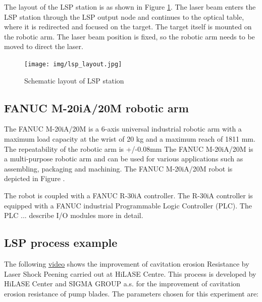 The layout of the LSP station is as shown in Figure \ref{fig:lsplayout}. The laser
beam enters the LSP station through the LSP output node and
continues to the optical table, where it is redirected and
focused on the target. The target itself is mounted on the
robotic arm. The laser beam position is fixed, so the robotic
arm needs to be moved to direct the laser.

\begin{figure}[h]
    \centering
    \texttt{[image: img/lsp\_layout.jpg]}
    \caption{Schematic layout of LSP station}
    \label{fig:lsplayout}
\end{figure}

\subsection{FANUC M-20iA/20M robotic arm}

The FANUC M-20iA/20M is a 6-axis universal industrial robotic arm with a maximum load capacity at the wrist of 20 kg and a maximum reach of 1811 mm. The repeatability of the robotic arm is +/-0.08mm The FANUC M-20iA/20M is a multi-purpose robotic arm and can be used for various applications such as assembling, packaging and machining. The  FANUC M-20iA/20M robot is depicted in Figure .

The robot is coupled with a FANUC R-30iA controller. The R-30iA controller is equipped with a FANUC industrial Programmable Logic Controller (PLC). The PLC ... describe I/O modules more in detail. 

\subsection{LSP process example}

The following \href{https://www.youtube.com/watch?v=awhlLU91-dk&ab_channel=HiLASECentre}{video} shows the improvement of cavitation erosion Resistance by Laser Shock Peening carried out at HiLASE Centre. This process is developed by HiLASE Center and SIGMA GROUP a.s. for the improvement of cavitation erosion resistance of pump blades. The parameters chosen for this experiment are:

